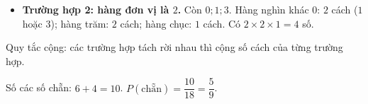 {\begin{itemize}[leftmargin=1.2em,itemsep=1pt,topsep=1pt]
\item \textbf{Trường hợp 2: hàng đơn vị là $2$.} Còn $0;1;3$. Hàng nghìn khác $0$: $2$ cách ($1$ hoặc $3$); hàng trăm: $2$ cách; hàng chục: $1$ cách. Có $2\times2\times1=4$ số.
\end{itemize}
\begin{recallbox}Quy tắc cộng: các trường hợp tách rời nhau thì cộng số cách của từng trường hợp.\end{recallbox}
Số các số chẵn: $6+4=10$.
$P(\text{chẵn})=\dfrac{10}{18}=\dfrac59$.
}

